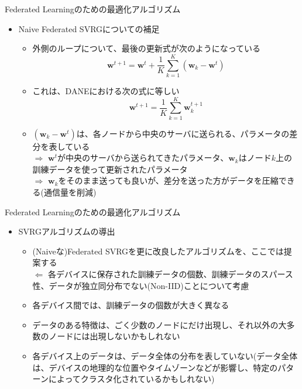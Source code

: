 \documentclass[dvipdfmx,notheorems,t]{beamer}
\begin{document}
\begin{frame}{Federated Learningのための最適化アルゴリズム}

\begin{itemize}
	\item Naive Federated SVRGについての補足
	\begin{itemize}
		\item 外側のループについて、最後の更新式が次のようになっている
		\begin{equation}
			\bm{w}^{t + 1} = \bm{w}^t + \frac{1}{K} \sum_{k = 1}^K \left( \bm{w}_k - \bm{w}^t \right)
		\end{equation}
		
		\item これは、DANEにおける次の式に等しい
		\begin{equation}
			\bm{w}^{t + 1} = \frac{1}{K} \sum_{k = 1}^K \bm{w}_k^{t + 1}
		\end{equation}
		
		\item $\left( \bm{w}_k - \bm{w}^t \right)$は、各ノードから中央のサーバに送られる、パラメータの差分を表している \\
		$\Rightarrow$ $\bm{w}^t$が中央のサーバから送られてきたパラメータ、$\bm{w}_k$はノード$k$上の訓練データを使って更新されたパラメータ \\
		$\Rightarrow$ $\bm{w}_k$をそのまま送っても良いが、差分を送った方がデータを圧縮できる(通信量を削減)
	\end{itemize}
\end{itemize}

\end{frame}

\begin{frame}{Federated Learningのための最適化アルゴリズム}

\begin{itemize}
	\item SVRGアルゴリズムの導出
	\begin{itemize}
		\item (Naiveな)Federated SVRGを更に改良したアルゴリズムを、ここでは提案する \\
		$\Leftarrow$ 各デバイスに保存された訓練データの個数、訓練データのスパース性、データが独立同分布でない(\alert{Non-IID})ことについて考慮
		\newline
		
		\item 各デバイス間では、訓練データの個数が大きく異なる
		\item データのある特徴は、ごく少数のノードにだけ出現し、それ以外の大多数のノードには出現しないかもしれない
		\item 各デバイス上のデータは、データ全体の分布を表していない(データ全体は、デバイスの地理的な位置やタイムゾーンなどが影響し、特定のパターンによってクラスタ化されているかもしれない)
	\end{itemize}
\end{itemize}

\end{frame}
\end{document}
